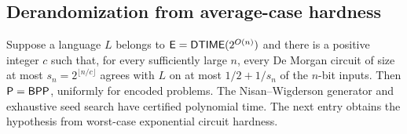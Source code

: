 \begin{result}
\subsection{Derandomization from average-case hardness}
Suppose a language $L$ belongs to $\mathsf{E}=\mathsf{DTIME}(2^{O(n)})$ and there is a
positive integer $c$ such that, for every sufficiently large $n$, every De Morgan
circuit of size at most $s_n=2^{\lfloor n/c\rfloor}$ agrees with $L$ on at most
$1/2+1/s_n$ of the $n$-bit inputs. Then $\mathsf{P}=\mathsf{BPP}$, uniformly for encoded
problems. The Nisan--Wigderson generator and exhaustive seed search have certified
polynomial time. The next entry obtains the hypothesis from worst-case exponential
circuit hardness.\citep{NisanWigderson1994}
\end{result}

